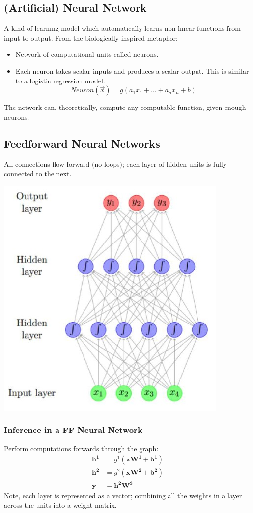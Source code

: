 \documentclass{article}
\begin{document}
\subsection{(Artificial) Neural Network}
A kind of learning model which automatically learns non-linear functions from input to output. From the biologically inspired metaphor:
\begin{itemize}
    \item Network of computational units called neurons.
    \item Each neuron takes scalar inputs and produces a scalar output. This is similar to a logistic regression model:
    \[Neuron(\vec{x}) = g(a_1x_1 + \ldots + a_nx_n + b)\]
\end{itemize}
The network can, theoretically, compute any computable function, given enough neurons.
\subsection{Feedforward Neural Networks}
All connections flow forward (no loops); each layer of hidden units is fully connected to the next.
\begin{center}
    \includegraphics[scale=0.5]{feedforward_nn.jpg}
\end{center}
\subsubsection{Inference in a FF Neural Network}
Perform computations forwards through the graph:
\begin{align}
    \mathbf{h^1} &= g^1(\mathbf{xW^1} + \mathbf{b^1})\\
    \mathbf{h^2} &= g^2(\mathbf{xW^2} + \mathbf{b^2})\\
    \mathbf{y} &= \mathbf{h^2W^3}
\end{align}
Note, each layer is represented as a vector; combining all the weights in a layer across the units into a weight matrix.
\end{document}
